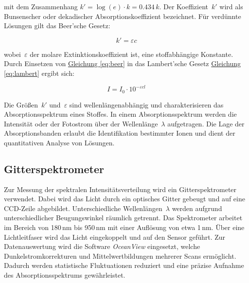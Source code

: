 mit dem Zusammenhang $k' = \log(e) \cdot k = 0.434\,k$. Der Koeffizient~$k'$ wird als Bunsenscher oder dekadischer Absorptionskoeffizient bezeichnet. Für verdünnte Lösungen gilt das Beer'sche Gesetz:

\begin{equation}
    k' = \varepsilon c
    \label{eq:beer}
\end{equation}

wobei~$\varepsilon$ der molare Extinktionskoeffizient ist, eine stoffabhängige Konstante. Durch Einsetzen von \hyperref[eq:beer]{Gleichung \ref*{eq:beer}} in das Lambert'sche Gesetz \hyperref[eq:lambert]{Gleichung \ref*{eq:lambert}} ergibt sich:

\begin{equation}
    I = I_0 \cdot 10^{-\varepsilon c l}
    \label{eq:combined}
\end{equation}

Die Größen~$k'$ und~$\varepsilon$ sind wellenlängenabhängig und charakterisieren das Absorptionsspektrum eines Stoffes. In einem Absorptionsspektrum werden die Intensität oder der Fotostrom über der Wellenlänge~$\lambda$ aufgetragen. Die Lage der Absorptionsbanden erlaubt die Identifikation bestimmter Ionen und dient der quantitativen Analyse von Lösungen.

\subsection*{Gitterspektrometer}
Zur Messung der spektralen Intensitätsverteilung wird ein Gitterspektrometer verwendet. Dabei wird das Licht durch ein optisches Gitter gebeugt und auf eine CCD-Zeile abgebildet. Unterschiedliche Wellenlängen~$\lambda$ werden aufgrund unterschiedlicher Beugungswinkel räumlich getrennt. Das Spektrometer arbeitet im Bereich von 180\,nm bis 950\,nm mit einer Auflösung von etwa 1\,nm. Über eine Lichtleitfaser wird das Licht eingekoppelt und auf den Sensor geführt. Zur Datenauswertung wird die Software \textit{OceanView} eingesetzt, welche Dunkelstromkorrekturen und Mittelwertbildungen mehrerer Scans ermöglicht. Dadurch werden statistische Fluktuationen reduziert und eine präzise Aufnahme des Absorptionsspektrums gewährleistet.
